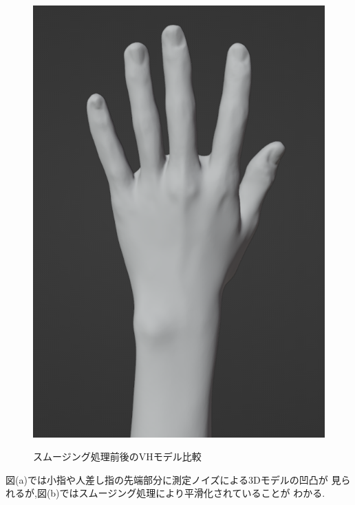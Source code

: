 \documentclass{ltjsreport}
\begin{document}
\begin{figure}[H]
		\hspace{0.04\columnwidth}
		\begin{minipage}{0.32\columnwidth}
		\centering
		\includegraphics[width = \columnwidth]{../figs/SmoothingAfterRear.png}
		\label{fig:smoothingafter}
		\end{minipage}
		\caption{スムージング処理前後のVHモデル比較}
		\label{fig:smoothing}
		\end{figure}
		\vspace{-15pt}

		図(a)では小指や人差し指の先端部分に測定ノイズによる3Dモデルの凹凸が
		見られるが,図(b)ではスムージング処理により平滑化されていることが
		わかる.
\end{document}
